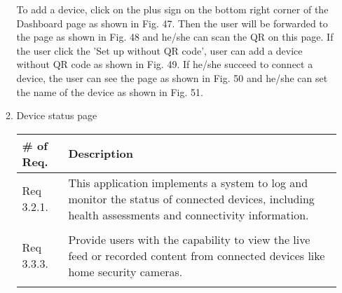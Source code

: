 \begin{enumerate}[label=\arabic*.]
\begin{enumerate}[label*={\arabic*.},ref=\theenumi.\arabic*]
                    To add a device, click on the plus sign on the bottom right corner of the Dashboard page as shown in Fig. 47. Then the user will be forwarded to the page as shown in Fig. 48 and he/she can scan the QR on this page. If the user click the 'Set up without QR code', user can add a device without QR code as shown in Fig. 49. If he/she succeed to connect a device, the user can see the page as shown in Fig. 50 and he/she can set the name of the device as shown in Fig. 51.  \\
                    \clearpage
              \item Device status page
                    \begin{table}[H]
                        \center
                        \begin{tabular}{m{1.4cm} m{5.5cm}}
                            \toprule
                            \# of Req. & Description                                                                                                                                         \\
                            \midrule
                            Req 3.2.1. & This application implements a system to log and monitor the status of connected devices, including health assessments and connectivity information. \\\\
                            Req 3.3.3. & Provide users with the capability to view the live feed or recorded content from connected devices like home security cameras.                      \\\\
                            \bottomrule
                        \end{tabular}
                    \end{table}


\end{enumerate}
\end{enumerate}
